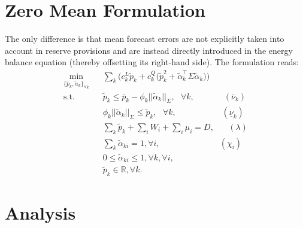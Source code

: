 \documentclass{article}
\begin{document}
\section{Zero Mean Formulation}

The only difference is that mean forecast errors are not explicitly taken into account in reserve provisions and are instead directly introduced in the energy balance equation (thereby offsetting its right-hand side). The formulation reads:
\begin{align}
\underset{\{\tilde{p}_k, \tilde{\alpha}_k\}_{\forall k}}{\min} \hspace{10pt} & \sum_k \Big(c_k^L \tilde{p}_k + c_k^Q \Big(\tilde{p}_k^2 + \tilde{\alpha}_k^\top \Sigma \tilde{\alpha}_k\Big)\Big)\\
\mbox{s.t. } & \tilde{p}_k \le \overline{p}_k - \phi_k ||\tilde{\alpha}_k||_{\Sigma}, \mbox{ }\forall k, \hspace{42pt}(\overline{\nu}_k)\\
& \phi_k ||\tilde{\alpha}_k||_{\Sigma} \le \tilde{p}_k, \mbox{ }\forall k, \hspace{65pt}(\underline{\nu}_k)\\
& \sum_k \tilde{p}_k + \sum_i W_i + \sum_i \mu_i = D, \hspace{20pt} (\lambda)\\
& \sum_k \tilde{\alpha}_{ki} = 1, \forall i, \hspace{85pt} (\chi_i)\\
& 0 \le \tilde{\alpha}_{ki} \le 1, \forall k, \forall i,\\
& \tilde{p}_k \in \mathbb{R}, \forall k.
\end{align}

\section{Analysis}
\end{document}
